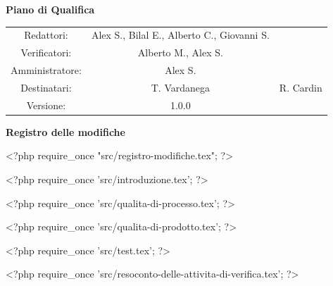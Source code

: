 \documentclass[a4paper, 11pt]{article}
\begin{document}
\begin{center}
\begin{Huge}
        \textbf{Piano di Qualifica} \\
        \vspace{4mm}

\end{Huge}

\vspace{20mm}

\begin{large}
\begin{spacing}{1.4}
\begin{tabular}{c c c}
   Redattori: & Alex S., Bilal E., Alberto C., Giovanni S. & \\
   Verificatori: & Alberto M., Alex S. & \\
   Amministratore: & Alex S. & \\
   Destinatari: & T. Vardanega & R. Cardin \\
   Versione: & 1.0.0 &
\end{tabular}
\end{spacing}
\end{large}
\end{center}

\pagebreak

\begin{huge}
    \textbf{Registro delle modifiche}
\end{huge}
\vspace{5pt}

<?php require_once "src/registro-modifiche.tex"; ?>

\pagebreak
\tableofcontents
\pagebreak

<?php require_once 'src/introduzione.tex'; ?>

<?php require_once 'src/qualita-di-processo.tex'; ?>

<?php require_once 'src/qualita-di-prodotto.tex'; ?>

<?php require_once 'src/test.tex'; ?>

<?php require_once 'src/resoconto-delle-attivita-di-verifica.tex'; ?>
\end{document}
